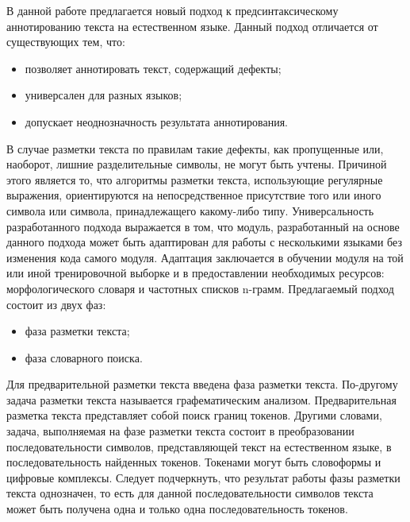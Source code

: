 В данной работе предлагается новый подход к предсинтаксическому аннотированию текста на естественном языке. Данный подход отличается от существующих тем, что: 
\begin{itemize}
\item
позволяет аннотировать текст, содержащий дефекты;
\item
универсален для разных языков;
\item
допускает неоднозначность результата аннотирования.
\end{itemize}
В случае разметки текста по правилам такие дефекты, как пропущенные или, наоборот, лишние разделительные символы, не могут быть учтены. Причиной этого является то, что алгоритмы разметки текста, использующие регулярные выражения, ориентируются на непосредственное присутствие того или иного символа или символа, принадлежащего какому-либо типу. Универсальность разработанного подхода выражается в том, что модуль, разработанный на основе данного подхода может быть адаптирован для работы с несколькими языками без изменения кода самого модуля. Адаптация заключается в обучении модуля на той или иной тренировочной выборке и в предоставлении необходимых ресурсов: морфологического словаря и частотных списков n-грамм.
Предлагаемый подход состоит из двух фаз:
\begin{itemize}
\item
фаза разметки текста;
\item
фаза словарного поиска.
\end{itemize}
Для предварительной разметки текста введена фаза разметки текста. По-другому задача разметки текста называется графематическим анализом. Предварительная разметка текста представляет собой поиск границ токенов. Другими словами, задача, выполняемая на фазе разметки текста состоит в преобразовании последовательности символов, представляющей текст на естественном языке, в последовательность найденных токенов. Токенами могут быть словоформы и цифровые комплексы. Следует подчеркнуть, что результат работы фазы разметки текста однозначен, то есть для данной последовательности символов текста может быть получена одна и только одна последовательность токенов. 
